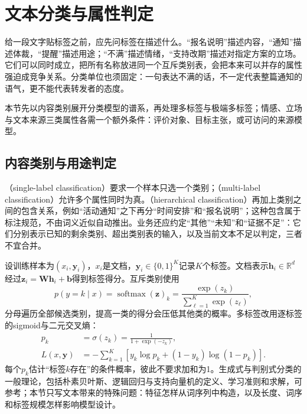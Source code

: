 \section{文本分类与属性判定}
\label{sec:nlp-classification-attributes}

给一段文字贴标签之前，应先问标签在描述什么。“报名说明”描述内容，“通知”描述体裁，“提醒”描述用途；“不满”描述情绪，“支持改期”描述对指定方案的立场。它们可以同时成立，把所有名称放进同一个互斥类别表，会把本来可以并存的属性强迫成竞争关系。分类单位也须固定：一句表达不满的话，不一定代表整篇通知的语气，更不能代表转发者的态度。

本节先以内容类别展开分类模型的谱系，再处理多标签与极端多标签；情感、立场与文本来源三类属性各需一个额外条件：评价对象、目标主张，或可访问的来源模型。

\subsection{内容类别与用途判定}
\label{sec:nlp-classification-content}

（single-label classification）要求一个样本只选一个类别；（multi-label classification）允许多个属性同时为真。（hierarchical classification）再加上类别之间的包含关系，例如“活动通知”之下再分“时间安排”和“报名说明”；这种包含属于标注规范，不由词义近似自动推出。业务还应约定“其他”“未知”和“证据不足”：它们分别表示已知的剩余类别、超出类别表的输入，以及当前文本不足以判定，三者不宜合并。

设训练样本为$(x_i,\bm y_i)$，$x_i$是文档，$\bm y_i\in\{0,1\}^{K}$记录$K$个标签。文档表示$\bm h_i\in\mathbb R^d$经过$\bm z_i=\bm W\bm h_i+\bm b$得到标签得分。互斥类别使用
\begin{equation}
  \label{eq:nlp-classification-softmax}
  p(y=k\mid x)=\operatorname{softmax}(\bm z)_k
  =\frac{\exp(z_k)}{\sum_{\ell=1}^{K}\exp(z_\ell)},
\end{equation}
分母遍历全部候选类别，提高一类的得分会压低其他类的概率。多标签改用逐标签的sigmoid与二元交叉熵：
\begin{equation}
  \label{eq:nlp-classification-sigmoid}
  \begin{aligned}
    p_k&=\sigma(z_k)=\frac{1}{1+\exp(-z_k)},\\
    L(x,\bm y)&=-\sum_{k=1}^{K}
    \left[y_k\log p_k+(1-y_k)\log(1-p_k)\right].
  \end{aligned}
\end{equation}
每个$p_k$估计“标签$k$存在”的条件概率，彼此不要求加和为1。生成式与判别式分类的一般理论，包括朴素贝叶斯、逻辑回归与支持向量机的定义、学习准则和求解，可参考；本节只写文本带来的特殊问题：特征怎样从词序列中构造，以及长度、词序和标签规模怎样影响模型设计。

